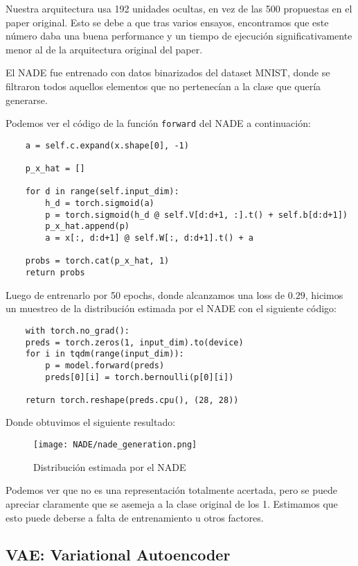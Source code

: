 \documentclass[11pt]{article}
\begin{document}
Nuestra arquitectura usa 192 unidades ocultas, en vez de las 500 propuestas en el paper original. Esto se debe a que tras varios ensayos, encontramos que este número daba una buena performance y un tiempo de ejecución significativamente menor al de la arquitectura original del paper. 

El NADE fue entrenado con datos binarizados del dataset MNIST, donde se filtraron todos aquellos elementos que no pertenecían a la clase que quería generarse.

Podemos ver el código de la función \texttt{forward} del NADE a continuación:

\begin{verbatim}
    a = self.c.expand(x.shape[0], -1)

    p_x_hat = []

    for d in range(self.input_dim):
        h_d = torch.sigmoid(a)
        p = torch.sigmoid(h_d @ self.V[d:d+1, :].t() + self.b[d:d+1])
        p_x_hat.append(p)
        a = x[:, d:d+1] @ self.W[:, d:d+1].t() + a

    probs = torch.cat(p_x_hat, 1)
    return probs
\end{verbatim}

Luego de entrenarlo por 50 epochs, donde alcanzamos una loss de $0.29$, hicimos un muestreo de la distribución estimada por el NADE con el siguiente código:
\begin{verbatim}
    with torch.no_grad():
    preds = torch.zeros(1, input_dim).to(device)
    for i in tqdm(range(input_dim)):
        p = model.forward(preds)
        preds[0][i] = torch.bernoulli(p[0][i])

    return torch.reshape(preds.cpu(), (28, 28))
\end{verbatim}
Donde obtuvimos el siguiente resultado:

\begin{figure}[h]
    \centering
    \texttt{[image: NADE/nade\_generation.png]}
    \caption{Distribución estimada por el NADE}
    \label{fig:nade_gen}
\end{figure}

Podemos ver que no es una representación totalmente acertada, pero se puede apreciar claramente que se asemeja a la clase original de los 1. Estimamos que esto puede deberse a falta de entrenamiento u otros factores.
\newpage
\subsection{VAE: Variational Autoencoder}
\end{document}
